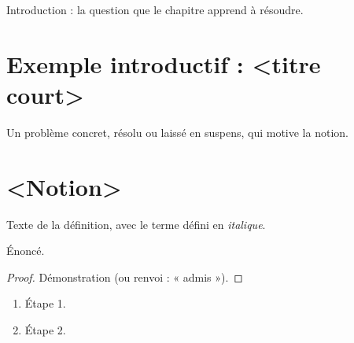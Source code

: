 \documentclass[11pt]{article}
\begin{document}

Introduction : la question que le chapitre apprend à résoudre.


\section{Exemple introductif : <titre court>}\label{sec:<slug-intro>}

Un problème concret, résolu ou laissé en suspens, qui motive la notion.

\section{<Notion>}\label{sec:<slug-notion>}

\begin{definition}\label{def:<slug>}
Texte de la définition, avec le terme défini en \emph{italique}.
\end{definition}

\begin{theoreme}\label{thm:<slug>}
Énoncé.
\end{theoreme}

\begin{proof}
Démonstration (ou renvoi : « admis »).
\end{proof}

\begin{methode}
\begin{enumerate}
  \item Étape 1.
  \item Étape 2.
\end{enumerate}
\end{methode}
\end{document}
